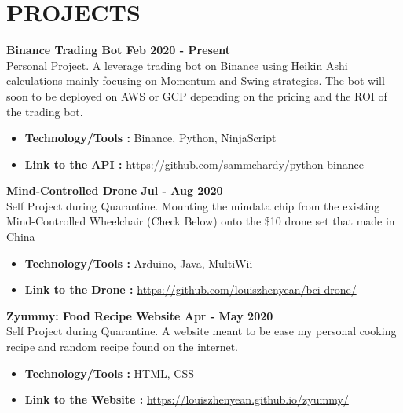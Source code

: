 \section{PROJECTS}

\textbf{Binance Trading Bot \hfill Feb 2020 - Present} \vspace{0.1cm} \\
    Personal Project. A leverage trading bot on Binance using Heikin Ashi calculations mainly focusing on Momentum and Swing strategies. The bot will soon to be deployed on AWS or GCP depending on the pricing and the ROI of the trading bot. \vspace{0.2cm}
    \begin{itemize}
        \item \textbf{Technology/Tools :} Binance, Python, NinjaScript
        \item \textbf{Link to the API :} \url{https://github.com/sammchardy/python-binance}
    \end{itemize}

\textbf{Mind-Controlled Drone \hfill Jul - Aug 2020} \vspace{0.1cm} \\
    Self Project during Quarantine. Mounting the mindata chip from the existing Mind-Controlled Wheelchair (Check Below) onto the \$10 drone set that made in China \vspace{0.2cm}
    \begin{itemize}
        \item \textbf{Technology/Tools :} Arduino, Java, MultiWii
        \item \textbf{Link to the Drone :} \url{https://github.com/louiszhenyean/bci-drone/}
    \end{itemize}
    
\textbf{Zyummy: Food Recipe Website \hfill Apr - May 2020} \vspace{0.1cm} \\
    Self Project during Quarantine. A website meant to be ease my personal cooking recipe and random recipe found on the internet.  \vspace{0.2cm}
    \begin{itemize}
        \item \textbf{Technology/Tools :} HTML, CSS
        \item \textbf{Link to the Website :} \url{https://louiszhenyean.github.io/zyummy/}
    \end{itemize}

